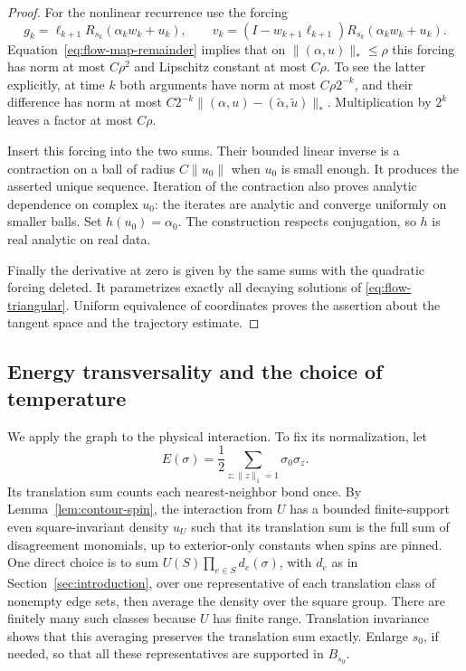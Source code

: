 \begin{proof}
For the nonlinear recurrence use the forcing
\[
 g_k=\ell_{k+1}R_{s_k}(\alpha_kw_k+u_k),\qquad
 v_k=(I-w_{k+1}\ell_{k+1})R_{s_k}(\alpha_kw_k+u_k).
\]
Equation~\eqref{eq:flow-map-remainder} implies that on
\(\|(\alpha,u)\|_*\le\rho\) this forcing has norm at most \(C\rho^2\)
and Lipschitz constant at most \(C\rho\).  To see the latter explicitly,
at time \(k\) both arguments have norm at most \(C\rho2^{-k}\), and
their difference has norm at most
\(C2^{-k}\|(\alpha,u)-(\widetilde\alpha,\widetilde u)\|_*\).
Multiplication by \(2^k\) leaves a factor at most \(C\rho\).

Insert this forcing into the two sums.  Their bounded linear inverse is a
contraction on a ball of radius \(C\|u_0\|\) when \(u_0\) is small
enough.  It produces the asserted unique sequence.  Iteration of the
contraction also proves analytic dependence on complex \(u_0\): the
iterates are analytic and converge uniformly on smaller balls.  Set
\(h(u_0)=\alpha_0\).  The construction respects conjugation, so \(h\)
is real analytic on real data.

Finally the derivative at zero is given by the same sums with the
quadratic forcing deleted.  It parametrizes exactly all decaying
solutions of \eqref{eq:flow-triangular}.  Uniform equivalence of
coordinates proves the assertion about the tangent space and the
trajectory estimate.
\end{proof}

\subsection{Energy transversality and the choice of temperature}

We apply the graph to the physical interaction.  To fix its normalization,
let
\[
 E(\sigma)=\frac12\sum_{z:\|z\|_1=1}\sigma_0\sigma_z.
\]
Its translation sum counts each nearest-neighbor bond once.  By
Lemma~\ref{lem:contour-spin}, the interaction from \(U\) has a bounded
finite-support even square-invariant density \(u_U\) such that its
translation sum is the full sum of disagreement monomials, up to
exterior-only constants when spins are pinned.  One direct choice is to
sum \(U(S)\prod_{e\in S}d_e(\sigma)\), with \(d_e\) as in
Section~\ref{sec:introduction}, over one
representative of each translation class of nonempty edge sets, then
average the density over the square group.  There are finitely many such
classes because \(U\) has finite range.  Translation invariance shows
that this averaging preserves the translation sum exactly.  Enlarge
\(s_0\), if needed, so that all these representatives are supported in
\(B_{s_0}\).

